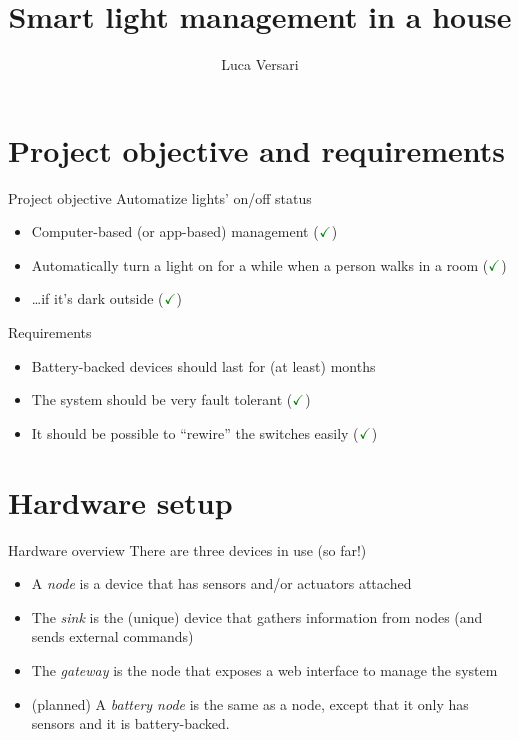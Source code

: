 \documentclass[italian]{beamer}
\author{Luca Versari}
\title{Smart light management in a house}
\newcommand{\ok}{$\color{darkgreen}\checkmark$}
\begin{document}
\frame{\titlepage}

\section{Project objective and requirements}
\begin{frame}{Project objective}
    Automatize lights' on/off status
    \begin{itemize}
        \item<2-> Computer-based (or app-based) management (\ok)
        \item<3-> Automatically turn a light on for a while when a person walks in a room (\ok)
        \item<4-> \dots if it's dark outside (\ok)
    \end{itemize}
\end{frame}

\begin{frame}{Requirements}
    \begin{itemize}
        \item<1-> Battery-backed devices should last for (at least) months
        \item<2-> The system should be very fault tolerant (\ok)
        \item<3-> It should be possible to ``rewire'' the switches easily (\ok)
    \end{itemize}
\end{frame}

\section{Hardware setup}
\begin{frame}{Hardware overview}
    There are three devices in use (so far!)
    \begin{itemize}
        \item<1-> A \textit{node} is a device that has sensors and/or actuators attached
        \item<2-> The \textit{sink} is the (unique) device that gathers information from nodes (and sends external commands)
        \item<3-> The \textit{gateway} is the node that exposes a web interface to manage the system
        \item<4-> (planned) A \textit{battery node} is the same as a node, except that it only has sensors and it is battery-backed.
    \end{itemize}
\end{frame}
\end{document}
